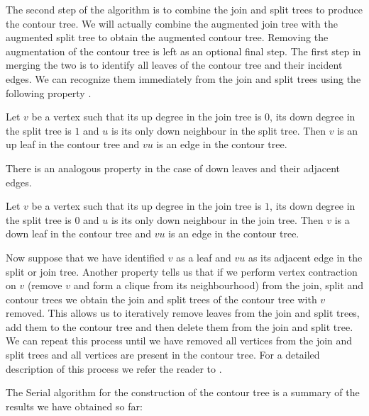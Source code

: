 The second step of the algorithm is to combine the join and split trees to produce the contour tree. We will actually combine the augmented join tree with the augmented split tree to obtain the augmented contour tree. Removing the augmentation of the contour tree is left as an optional final step. The first step in merging the two is to identify all leaves of the contour tree and their incident edges. We can recognize them immediately from the join and split trees using the following property \cite{carr-masters}.

\begin{property} Let $v$ be a vertex such that its up degree in the join tree is $0$, its down degree in the split tree is $1$ and $u$ is its only down neighbour in the split tree. Then $v$ is an up leaf in the contour tree and $vu$ is an edge in the contour tree.  \end{property}

There is an analogous property in the case of down leaves and their adjacent edges.

\begin{property} Let $v$ be a vertex such that its up degree in the join tree is $1$, its down degree in the split tree is $0$ and $u$ is its only down neighbour in the join tree. Then $v$ is a down leaf in the contour tree and $vu$ is an edge in the contour tree.  \end{property}

Now suppose that we have identified $v$ as a leaf and $vu$ as its adjacent edge in the split or join tree. Another property \cite{carr-masters} tells us that if we perform vertex contraction on $v$ (remove $v$ and form a clique from its neighbourhood) from the join, split and contour trees we obtain the join and split trees of the contour tree with $v$ removed. This allows us to iteratively remove leaves from the join and split trees, add them to the contour tree and then delete them from the join and split tree. We can repeat this process until we have removed all vertices from the join and split trees and all vertices are present in the contour tree. For a detailed description of this process we refer the reader to \cite{ct-big-paper}.


The Serial algorithm for the construction of the contour tree is a summary of the results we have obtained so far:

